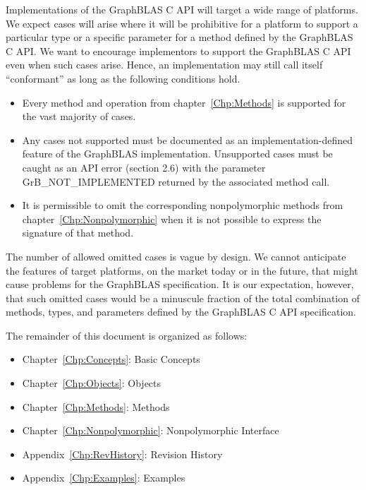 \documentclass[11pt]{extbook}
\begin{document}
Implementations of the GraphBLAS C API will target a wide range of platforms.  We expect cases will arise where it will be 
prohibitive for a platform to support a particular type or a specific parameter for a method defined by the GraphBLAS C API.   We 
want to encourage implementors to support  the GraphBLAS C API even when such cases arise.  Hence, an implementation
may still call itself ``conformant'' as long as the following conditions hold.
\begin{itemize}
\item Every method and operation from chapter~\ref{Chp:Methods} is supported for the vast majority of cases.  
\item  Any cases not supported  must be documented as an implementation-defined feature of the GraphBLAS implementation. 
Unsupported cases must be caught as an API error (section 2.6) with the parameter {\sf GrB\_NOT\_IMPLEMENTED} returned by the associated method call. 
\item It is permissible to omit the corresponding nonpolymorphic methods from chapter~\ref{Chp:Nonpolymorphic} when it is not
possible to express the signature of that method.  
\end{itemize}
The number of allowed omitted cases is vague by design.  We cannot anticipate the features of target platforms,
on the market today or in the future, that might cause problems for the GraphBLAS specification.  It is our expectation, however,  that such omitted 
cases  would be a minuscule fraction of the total combination of methods, types, and parameters defined by the GraphBLAS C API specification.

The remainder of this document is organized as follows:
\begin{itemize}
\item Chapter~\ref{Chp:Concepts}: Basic Concepts
\item Chapter~\ref{Chp:Objects}: Objects
\item Chapter~\ref{Chp:Methods}: Methods
\item Chapter~\ref{Chp:Nonpolymorphic}: Nonpolymorphic Interface
\item Appendix~\ref{Chp:RevHistory}: Revision History
\item Appendix~\ref{Chp:Examples}: Examples
\end{itemize}

\end{document}
